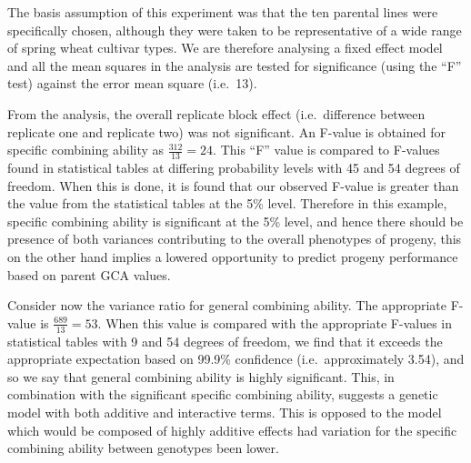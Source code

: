 \documentclass[nofonts,]{tufte-handout}
\begin{document}
\begin{table}

\caption{\label{tab:half-diallel-pht-anova}Degrees of freedom, sum of squares and mean squares from the analysis of variance of plant height of a half diallel including parent selfs. In the analysis, the total variance is partitioned into differences between the two replicate blocks (replication), general combining ability (Genotype male), specific combining ability (Genotype male:Genotype female) and an error term (based based on the replicate differences)}
\centering
{}
\end{table}

The basis assumption of this experiment was that the ten parental lines
were specifically chosen, although they were taken to be representative
of a wide range of spring wheat cultivar types. We are therefore
analysing a fixed effect model and all the mean squares in the analysis
are tested for significance (using the ``F'' test) against the error
mean square (i.e.~13).

From the analysis, the overall replicate block effect (i.e.~difference
between replicate one and replicate two) was not significant. An F-value
is obtained for specific combining ability as \(\frac{312}{13} = 24\).
This ``F'' value is compared to F-values found in statistical tables at
differing probability levels with 45 and 54 degrees of freedom. When
this is done, it is found that our observed F-value is greater than the
value from the statistical tables at the 5\% level. Therefore in this
example, specific combining ability is significant at the 5\% level, and
hence there should be presence of both variances contributing to the
overall phenotypes of progeny, this on the other hand implies a lowered
opportunity to predict progeny performance based on parent GCA values.

Consider now the variance ratio for general combining ability. The
appropriate F-value is \(\frac{689}{13} = 53\). When this value is
compared with the appropriate F-values in statistical tables with 9 and
54 degrees of freedom, we find that it exceeds the appropriate
expectation based on 99.9\% confidence (i.e.~approximately 3.54), and so
we say that general combining ability is highly significant. This, in
combination with the significant specific combining ability, suggests a
genetic model with both additive and interactive terms. This is opposed
to the model which would be composed of highly additive effects had
variation for the specific combining ability between genotypes been
lower.
\end{document}
